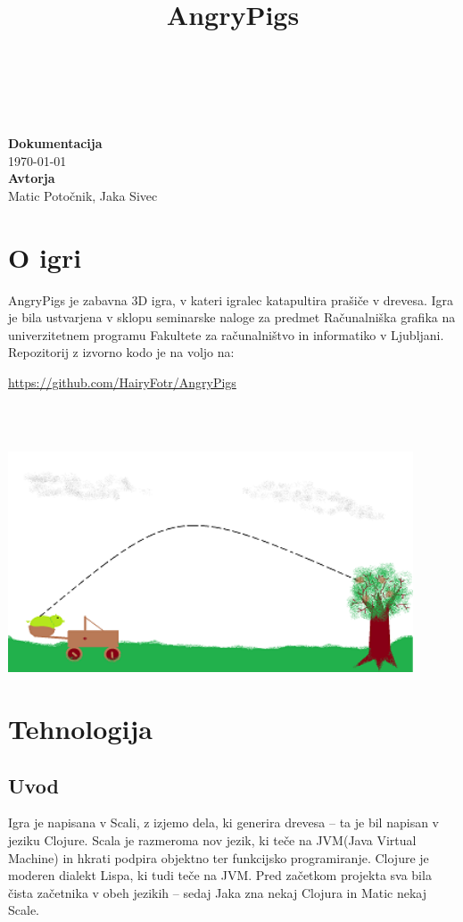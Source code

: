 \documentclass[10pt,a4paper,oneside]{book}
\title{AngryPigs}
\newcommand\inline[1]{%
\begin{Sbox}{#1}\end{Sbox}%
\colorbox{lightgray}{\TheSbox}%
}
\newcommand\br{%
 \ \\ \ \\%
}
\def\pa{\\[-6pt]}
\begin{document}
\begin{titlepage}
\begin{center}
\ \\[3.5cm]
{}\\[-2.8cm]
{}\\[3.9cm]
{\Huge\bf Dokumentacija}\\[0.35cm]
{\huge\today}\ \\[4.5cm]
{\Huge {\bf Avtorja}}\\[0.35cm]
{\huge Matic Potočnik, Jaka Sivec}
\vfill
\end{center}
\end{titlepage}
\chapter{O igri}
AngryPigs je zabavna 3D igra, v kateri igralec katapultira prašiče v drevesa. Igra je bila ustvarjena v sklopu seminarske naloge za predmet Računalniška grafika na univerzitetnem programu Fakultete za računalništvo in informatiko v Ljubljani. Repozitorij z izvorno kodo je na voljo na:\\ \inline{\url{https://github.com/HairyFotr/AngryPigs}}
\br
\begin{center}
\includegraphics[width=12cm]{conceptsmall}
\end{center}

\chapter{Tehnologija}
\section{Uvod}
Igra je napisana v Scali, z izjemo dela, ki generira drevesa -- ta je bil napisan v jeziku Clojure. Scala je razmeroma nov jezik, ki teče na JVM(Java Virtual Machine) in hkrati podpira objektno ter funkcijsko programiranje. Clojure je moderen dialekt Lispa, ki tudi teče na JVM. Pred začetkom projekta sva bila čista začetnika v obeh jezikih -- sedaj Jaka zna nekaj Clojura in Matic nekaj Scale.\pa
\end{document}
